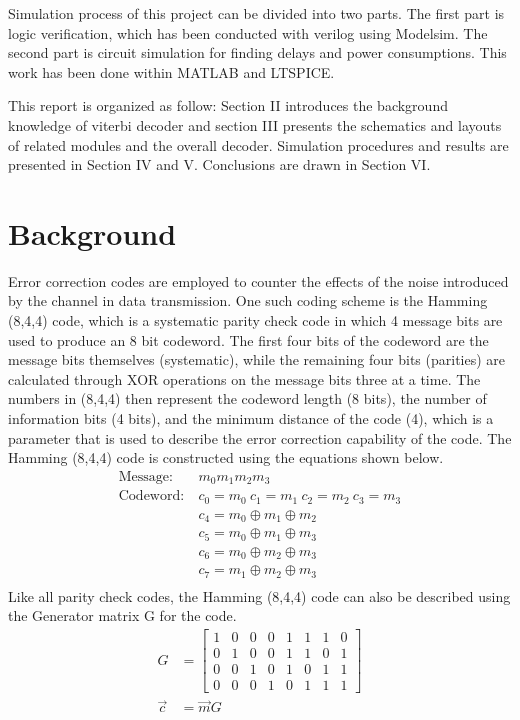 \documentclass[conference]{IEEEtran}
\begin{document}
Simulation process of this project can be divided into two parts. The first part is logic verification, which has been conducted with verilog using Modelsim. The second part is circuit simulation for finding delays and power consumptions. This work has been done within MATLAB and LTSPICE.

This report is organized as follow: Section II introduces the background knowledge of viterbi decoder and section III presents the schematics and layouts of related modules and the overall decoder. Simulation procedures and results are presented in Section IV and V. Conclusions are drawn in Section VI.

\section {Background}
Error correction codes are employed to counter the effects of the noise introduced by the channel in data transmission. One such coding scheme is the Hamming (8,4,4) code, which is a systematic parity check code in which 4 message bits are used to produce an 8 bit codeword. The first four bits of the codeword are the message bits themselves (systematic), while the remaining four bits (parities) are calculated through XOR operations on the message bits three at a time. The numbers in (8,4,4) then represent the codeword length (8 bits), the number of information bits (4 bits), and the minimum distance of the code (4), which is a parameter that is used to describe the error correction capability of the code. The Hamming (8,4,4) code is constructed using the equations shown below.
\begin{equation}
\begin{align}
    \text{Message:}\ &m_{0}m_{1}m_{2}m_{3}\\
    \text{Codeword:}\ &c_{0} = m_{0}\ c_{1} = m_{1}\ c_{2} = m_{2}\ c_{3} = m_{3}\\
    &c_{4} = m_{0}\oplus m_{1}\oplus m_{2}\\
    &c_{5} = m_{0}\oplus m_{1}\oplus m_{3}\\
    &c_{6} = m_{0}\oplus m_{2}\oplus m_{3}\\
    &c_{7} = m_{1}\oplus m_{2}\oplus m_{3}\\
\end{align}
\end{equation}
Like all parity check codes, the Hamming (8,4,4) code can also be described using the Generator matrix G for the code.
\begin{equation}
\begin{align}
G&=
\begin{bmatrix}
1 & 0 & 0 & 0 & 1 & 1 & 1 & 0\\ 
0 & 1 & 0 & 0 & 1 & 1 & 0 & 1\\ 
0 & 0 & 1 & 0 & 1 & 0 & 1 & 1\\ 
0 & 0 & 0 & 1 & 0 & 1 & 1 & 1
\end{bmatrix}\\
\vec{c} &= \vec{m}G
\end{align}
\end{equation}
\end{document}
